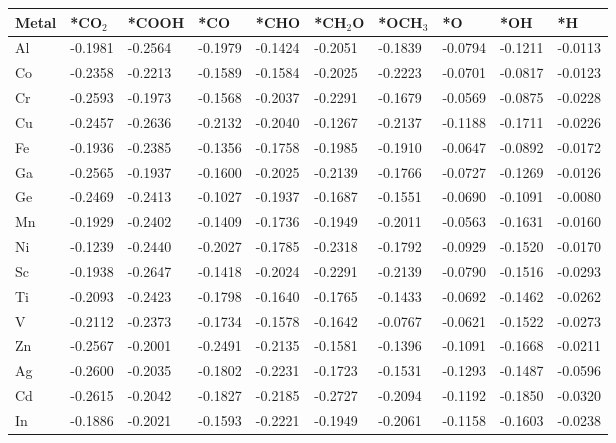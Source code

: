 \begin{table}[h]
  \centering
  {\fontsize{6}{12}\selectfont
  \begin{tabular}{*{10}{l}}
      \hline
      Metal & *CO$_2$ & *COOH& *CO     & *CHO    & *CH$_2$O& *OCH$_3$& *O      & *OH     & *H      \\
      \hline
      Al & -0.1981 & -0.2564 & -0.1979 & -0.1424 & -0.2051 & -0.1839 & -0.0794 & -0.1211 & -0.0113 \\
      Co & -0.2358 & -0.2213 & -0.1589 & -0.1584 & -0.2025 & -0.2223 & -0.0701 & -0.0817 & -0.0123 \\
      Cr & -0.2593 & -0.1973 & -0.1568 & -0.2037 & -0.2291 & -0.1679 & -0.0569 & -0.0875 & -0.0228 \\
      Cu & -0.2457 & -0.2636 & -0.2132 & -0.2040 & -0.1267 & -0.2137 & -0.1188 & -0.1711 & -0.0226 \\
      Fe & -0.1936 & -0.2385 & -0.1356 & -0.1758 & -0.1985 & -0.1910 & -0.0647 & -0.0892 & -0.0172 \\
      Ga & -0.2565 & -0.1937 & -0.1600 & -0.2025 & -0.2139 & -0.1766 & -0.0727 & -0.1269 & -0.0126 \\
      Ge & -0.2469 & -0.2413 & -0.1027 & -0.1937 & -0.1687 & -0.1551 & -0.0690 & -0.1091 & -0.0080 \\
      Mn & -0.1929 & -0.2402 & -0.1409 & -0.1736 & -0.1949 & -0.2011 & -0.0563 & -0.1631 & -0.0160 \\
      Ni & -0.1239 & -0.2440 & -0.2027 & -0.1785 & -0.2318 & -0.1792 & -0.0929 & -0.1520 & -0.0170 \\
      Sc & -0.1938 & -0.2647 & -0.1418 & -0.2024 & -0.2291 & -0.2139 & -0.0790 & -0.1516 & -0.0293 \\
      Ti & -0.2093 & -0.2423 & -0.1798 & -0.1640 & -0.1765 & -0.1433 & -0.0692 & -0.1462 & -0.0262 \\
      V  & -0.2112 & -0.2373 & -0.1734 & -0.1578 & -0.1642 & -0.0767 & -0.0621 & -0.1522 & -0.0273 \\
      Zn & -0.2567 & -0.2001 & -0.2491 & -0.2135 & -0.1581 & -0.1396 & -0.1091 & -0.1668 & -0.0211 \\
      Ag & -0.2600 & -0.2035 & -0.1802 & -0.2231 & -0.1723 & -0.1531 & -0.1293 & -0.1487 & -0.0596 \\
      Cd & -0.2615 & -0.2042 & -0.1827 & -0.2185 & -0.2727 & -0.2094 & -0.1192 & -0.1850 & -0.0320 \\
      In & -0.1886 & -0.2021 & -0.1593 & -0.2221 & -0.1949 & -0.2061 & -0.1158 & -0.1603 & -0.0238 \\

\end{tabular}}
\end{table}
